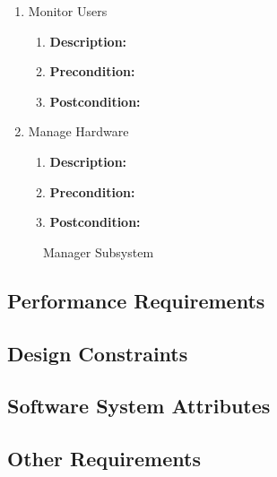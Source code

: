 \documentclass{article}
\begin{document}
\begin{enumerate}
\begin{enumerate}
		\item Monitor Users
		\begin{enumerate}
			\item \textbf{Description:}
			\item \textbf{Precondition:} 
			\item \textbf{Postcondition:} \newline
		\end{enumerate}
		
		\item Manage Hardware
		\begin{enumerate}
			\item \textbf{Description:} 
			\item \textbf{Precondition:}
			\item \textbf{Postcondition:}\newline
		\end{enumerate}
	\end{enumerate}
	\begin{figure}[h!]
		\caption{Manager Subsystem}	
	\end{figure}	
	\end{enumerate}
	
	
	\subsection{Performance Requirements}
	\subsection{Design Constraints}
	\subsection{Software System Attributes}
	\subsection{Other Requirements}
\end{document}
